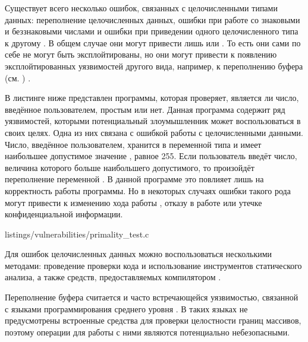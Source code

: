 %
Существует всего несколько  ошибок, связанных с целочисленными типами данных: переполнение целочисленных данных, ошибки при работе со знаковыми и беззнаковыми числами и ошибки при приведении одного целочисленного типа к другому     . 
%
В общем случае они могут привести лишь  или . 
%
То есть они сами по себе не могут быть эксплойтированы, но они могут привести к появлению эксплойтированных уязвимостей другого вида, например, к переполнению буфера (см. ) . 

%
В листинге ниже представлен  программы, которая проверяет, является ли число, введённое пользователем, простым или нет. 
%
Данная программа содержит ряд уязвимостей, которыми потенциальный злоумышленник может воспользоваться в своих целях. 
%
Одна из них связана с ошибкой работы с целочисленными данными.
%
Число, введённое пользователем, хранится в переменной  типа  и имеет наибольшее допустимое значение , равное 255.
%
Если пользователь введёт число, величина которого больше наибольшего допустимого, то произойдёт переполнение переменной . 
%
В данной программе это повлияет лишь на корректность работы программы. 
%
Но в некоторых случаях ошибки такого рода могут привести к изменению хода работы , отказу в работе или утечке конфиденциальной информации.

\newpage
{}
	{listings/vulnerabilities/primality_test.c}
\newpage

%
Для  ошибок целочисленных данных можно воспользоваться несколькими методами: проведение проверки кода и использование инструментов статического анализа, а также средств, предоставляемых компилятором  .



%
Переполнение буфера считается  и часто встречающейся уязвимостью, связанной с языками программирования среднего уровня . 
%
В таких языках не предусмотрены встроенные средства для проверки целостности границ массивов, поэтому операции для работы с ними являются потенциально небезопасными. 


